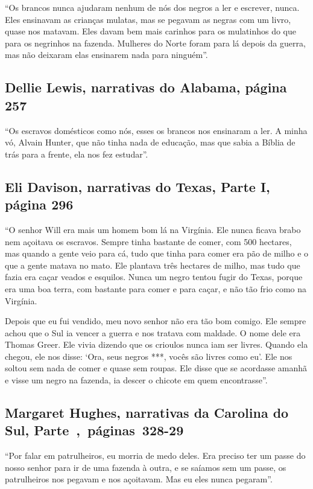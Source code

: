 ``Os brancos nunca ajudaram nenhum de nós dos negros a ler e escrever,
nunca. Eles ensinavam as crianças mulatas, mas se pegavam as negras com
um livro, quase nos matavam. Eles davam bem mais carinhos para os
mulatinhos do que para os negrinhos na fazenda. Mulheres do Norte foram
para lá depois da guerra, mas não deixaram elas ensinarem nada para
ninguém''.

\subsection{Dellie Lewis, narrativas do Alabama, página 257}
\label{ref170}

``Os escravos domésticos como nós, esses os brancos nos ensinaram a ler.
A minha vó, Alvain Hunter, que não tinha nada de educação, mas que sabia
a Bíblia de trás para a frente, ela nos fez estudar''.

\subsection{Eli Davison, narrativas do Texas, Parte I, página 296} \label{ref69}

``O senhor Will era mais um homem bom lá na Virgínia. Ele nunca ficava
brabo nem açoitava os escravos. Sempre tinha bastante de comer, com 500
hectares, mas quando a gente veio para cá, tudo que tinha para comer era
pão de milho e o que a gente matava no mato. Ele plantava três hectares
de milho, mas tudo que fazia era caçar veados e esquilos. Nunca um negro
tentou fugir do Texas, porque era uma boa terra, com bastante para comer
e para caçar, e não tão frio como na Virgínia.

Depois que eu fui vendido, meu novo senhor não era tão bom comigo. Ele
sempre achou que o Sul ia vencer a guerra e nos tratava com maldade. O
nome dele era Thomas Greer. Ele vivia dizendo que os crioulos nunca iam
ser livres. Quando ela chegou, ele nos disse: `Ora, seus negros ***,
vocês são livres como eu'. Ele nos soltou sem nada de comer e quase sem
roupas. Ele disse que se acordasse amanhã e visse um negro na fazenda,
ia descer o chicote em quem encontrasse''.

\subsection{Margaret Hughes, narrativas da Carolina do Sul, Parte~,~páginas~328-29}
\label{ref153}

``Por falar em patrulheiros, eu morria de medo deles. Era preciso ter um
passe do nosso senhor para ir de uma fazenda à outra, e se saíamos sem
um passe, os patrulheiros nos pegavam e nos açoitavam. Mas eu eles nunca
pegaram''.

